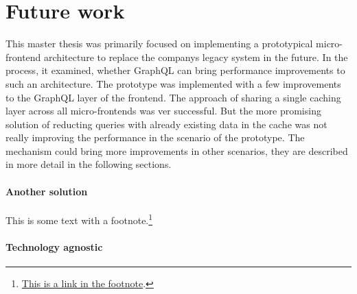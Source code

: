 \chapter{Future work}\label{chapter:future-work}

This master thesis was primarily focused on implementing a prototypical micro-frontend architecture to replace the companys legacy system in the future. In the process, it examined, whether GraphQL can bring performance improvements to such an architecture. The prototype was implemented with a few improvements to the GraphQL layer of the frontend. The approach of sharing a single caching layer across all micro-frontends was ver successful. But the more promising solution of reducting queries with already existing data in the cache was not really improving the performance in the scenario of the prototype. The mechanism could bring more improvements in other scenarios, they are described in more detail in the following sections.

\subsubsection{Another solution}

This is some text with a footnote.\footnote{\href{https://example.com/}{This is a link in the footnote}.}


\subsubsection{Technology agnostic}







